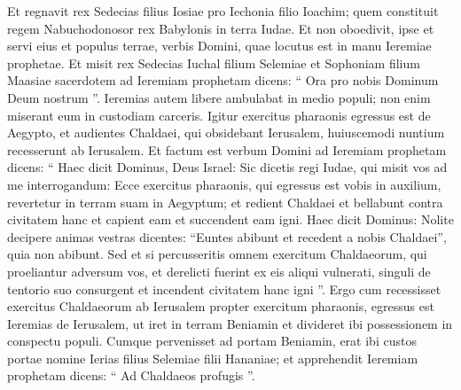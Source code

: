 \begin{biblechapter}
\begin{biblechapter}
\begin{biblechapter}
\begin{biblechapter}
\begin{biblechapter}
\begin{biblechapter}
\begin{biblechapter}
\begin{biblechapter}
\begin{biblechapter}
\begin{biblechapter}
\begin{biblechapter}
\begin{biblechapter}
\begin{biblechapter}
\begin{biblechapter}
\begin{biblechapter}
\begin{biblechapter}
\begin{biblechapter}
\begin{biblechapter}
\begin{biblechapter}
\begin{biblechapter}
\begin{biblechapter}
\begin{biblechapter}
\begin{biblechapter}
\begin{biblechapter}
\begin{biblechapter}
\begin{biblechapter}
\begin{biblechapter}
\begin{biblechapter}
\begin{biblechapter}
\begin{biblechapter}
\begin{biblechapter}
\begin{biblechapter}
\begin{biblechapter}
\begin{biblechapter}
\begin{biblechapter}
\begin{biblechapter}
\begin{biblechapter}
\verse Et regnavit rex Sedecias filius Iosiae pro Iechonia filio Ioachim; quem constituit regem Nabuchodonosor rex Babylonis in terra Iudae. 
\verse Et non oboedivit, ipse et servi eius et populus terrae, verbis Domini, quae locutus est in manu Ieremiae prophetae.
 \verse Et misit rex Sedecias Iuchal filium Selemiae et Sophoniam filium Maasiae sacerdotem ad Ieremiam prophetam dicens: “ Ora pro nobis Dominum Deum nostrum ”. 
 \verse Ieremias autem libere ambulabat in medio populi; non enim miserant eum in custodiam carceris. 
\verse Igitur exercitus pharaonis egressus est de Aegypto, et audientes Chaldaei, qui obsidebant Ierusalem, huiuscemodi nuntium recesserunt ab Ierusalem. 
\verse Et factum est verbum Domini ad Ieremiam prophetam dicens: 
\verse “ Haec dicit Dominus, Deus Israel: Sic dicetis regi Iudae, qui misit vos ad me interrogandum: Ecce exercitus pharaonis, qui egressus est vobis in auxilium, revertetur in terram suam in Aegyptum; 
\verse et redient Chaldaei et bellabunt contra civitatem hanc et capient eam et succendent eam igni. 
\verse Haec dicit Dominus: Nolite decipere animas vestras dicentes: “Euntes abibunt et recedent a nobis Chaldaei”, quia non abibunt. 
\verse Sed et si percusseritis omnem exercitum Chaldaeorum, qui proeliantur adversum vos, et derelicti fuerint ex eis aliqui vulnerati, singuli de tentorio suo consurgent et incendent civitatem hanc igni ”.
 \verse Ergo cum recessisset exercitus Chaldaeorum ab Ierusalem propter exercitum pharaonis, 
\verse egressus est Ieremias de Ierusalem, ut iret in terram Beniamin et divideret ibi possessionem in conspectu populi. 
\verse Cumque pervenisset ad portam Beniamin, erat ibi custos portae nomine Ierias filius Selemiae filii Hananiae; et apprehendit Ieremiam prophetam dicens: “ Ad Chaldaeos profugis ”. 

\end{biblechapter}
\end{biblechapter}
\end{biblechapter}
\end{biblechapter}
\end{biblechapter}
\end{biblechapter}
\end{biblechapter}
\end{biblechapter}
\end{biblechapter}
\end{biblechapter}
\end{biblechapter}
\end{biblechapter}
\end{biblechapter}
\end{biblechapter}
\end{biblechapter}
\end{biblechapter}
\end{biblechapter}
\end{biblechapter}
\end{biblechapter}
\end{biblechapter}
\end{biblechapter}
\end{biblechapter}
\end{biblechapter}
\end{biblechapter}
\end{biblechapter}
\end{biblechapter}
\end{biblechapter}
\end{biblechapter}
\end{biblechapter}
\end{biblechapter}
\end{biblechapter}
\end{biblechapter}
\end{biblechapter}
\end{biblechapter}
\end{biblechapter}
\end{biblechapter}
\end{biblechapter}
